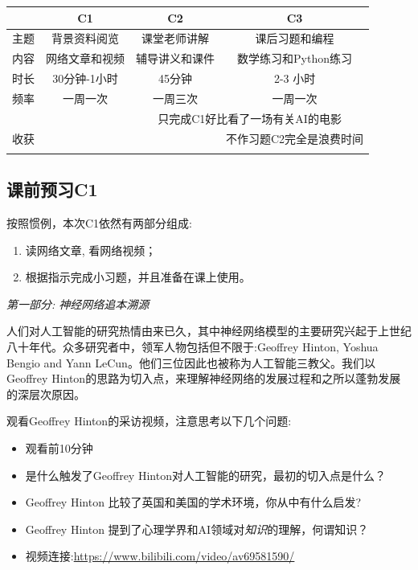 \documentclass[12pt]{article}
\numberwithin{equation}{section}
\begin{document}
\begin{table}[H]
	\centering
	\renewcommand{\arraystretch}{1.6}
	\begin{tabular}{|c|c|c|c|}
		\hline
		& C1 & C2 & C3 \\
		\hline 
		主题& 背景资料阅览 & 课堂老师讲解 & 课后习题和编程 \\
		\hline
		内容& 网络文章和视频 & 辅导讲义和课件 & 数学练习和Python练习 \\
		\hline
		时长 & 30分钟-1小时 & 45分钟 & 2-3 小时 \\
		\hline 
		频率 & 一周一次 & 一周三次 & 一周一次 \\
		\hline 
		 & \checkmark & \multicolumn{2}{c|}{只完成C1好比看了一场有关AI的电影} \\
		\cline{2-4}
		收获&  \checkmark & \checkmark & 不作习题C2完全是浪费时间 \\
		\cline{2-4}
		& \checkmark & \checkmark & \checkmark \\
		\hline 
	\end{tabular}
\end{table}


\setcounter{section}{3}
\subsection{课前预习C1}

按照惯例，本次C1依然有两部分组成:
\begin{enumerate}
	\item 读网络文章, 看网络视频；
	\item 根据指示完成小习题，并且准备在课上使用。
\end{enumerate}

\noindent
\textit{第一部分: 神经网络追本溯源}

人们对人工智能的研究热情由来已久，其中神经网络模型的主要研究兴起于上世纪八十年代。众多研究者中，领军人物包括但不限于:Geoffrey Hinton,  Yoshua Bengio and Yann LeCun。他们三位因此也被称为人工智能三教父。我们以Geoffrey Hinton的思路为切入点，来理解神经网络的发展过程和之所以蓬勃发展的深层次原因。

观看Geoffrey Hinton的采访视频，注意思考以下几个问题:
\begin{itemize}
	\item 观看前10分钟
	\item 是什么触发了Geoffrey Hinton对人工智能的研究，最初的切入点是什么？
	\item Geoffrey Hinton 比较了英国和美国的学术环境，你从中有什么启发?
	\item Geoffrey Hinton 提到了心理学界和AI领域对\textit{知识}的理解，何谓知识？
	\item 视频连接:\url{https://www.bilibili.com/video/av69581590/}
\end{itemize}
\end{document}
